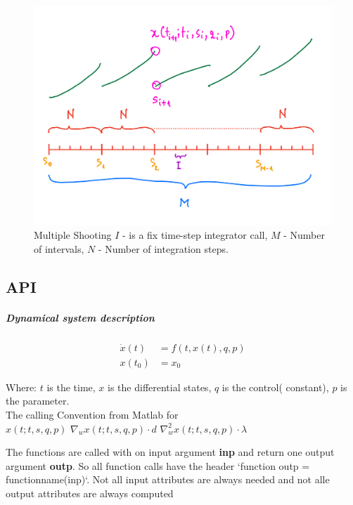 \documentclass[12pt, letterpaper]{article}
\begin{document}
\begin{figure}[h!]
    \centering
    \includegraphics[scale=0.25]{images/multipleShooting.png}
    \caption{Multiple Shooting $I$ - is a fix time-step integrator call, $M$ - Number of intervals, $N$ - Number of integration steps.}
    \label{multipleShootingImg}
\end{figure}






\subsection{API}
\subparagraph{Dynamical system description}

\begin{subequations}
\begin{align}
\dot{x}(t) &= f(t, x(t), q, p)   \\
x(t_0) &=x_0
\end{align}
\end{subequations}

Where:
$t$ is the time,
$x$ is the differential states,
$q$ is the control( constant),
$p$ is the parameter.
\\
The calling Convention from Matlab for \\
\boldmath$x(t;t,s,q,p)$   
\boldmath$\nabla_{w} x(t;t,s,q,p)\cdot d$   
\boldmath$\nabla^2_{w} x(t;t,s,q,p) \cdot \lambda$
        

The functions are called with on input argument \textbf{inp} and return one output argument \textbf{outp}. So all function calls have the header `function outp = functionname(inp)`. Not all input attributes are always needed and not alle output attributes are always computed
\end{document}
